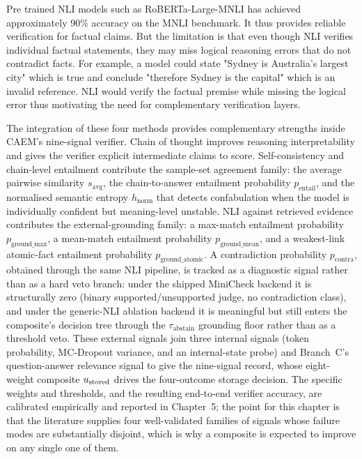 Pre trained NLI models such as RoBERTa-Large-MNLI has achieved approximately 90\% accuracy on the MNLI benchmark. It thus provides reliable verification for factual claims. But the limitation is that even though NLI verifies individual factual statements, they may miss logical reasoning errors that do not contradict facts. For example, a model could state "Sydney is Australia's largest city" which is true and conclude "therefore Sydney is the capital" which is an invalid reference. NLI would verify the factual premise while missing the logical error thus motivating the need for complementary verification layers.

The integration of these four methods provides complementary strengths inside CAEM's nine-signal verifier. Chain of thought improves reasoning interpretability and gives the verifier explicit intermediate claims to score. Self-consistency and chain-level entailment contribute the sample-set agreement family: the average pairwise similarity $s_{\text{avg}}$, the chain-to-answer entailment probability $p_{\text{entail}}$, and the normalised semantic entropy $h_{\text{norm}}$ that detects confabulation when the model is individually confident but meaning-level unstable. NLI against retrieved evidence contributes the external-grounding family: a max-match entailment probability $p_{\text{ground\_max}}$, a mean-match entailment probability $p_{\text{ground\_mean}}$, and a weakest-link atomic-fact entailment probability $p_{\text{ground\_atomic}}$. A contradiction probability $p_{\text{contra}}$, obtained through the same NLI pipeline, is tracked as a diagnostic signal rather than as a hard veto branch: under the shipped MiniCheck backend it is structurally zero (binary supported/unsupported judge, no contradiction class), and under the generic-NLI ablation backend it is meaningful but still enters the composite's decision tree through the $\tau_{\text{abstain}}$ grounding floor rather than as a threshold veto. These external signals join three internal signals (token probability, MC-Dropout variance, and an internal-state probe) and Branch~C's question-answer relevance signal to give the nine-signal record, whose eight-weight composite $u_{\text{stored}}$ drives the four-outcome storage decision. The specific weights and thresholds, and the resulting end-to-end verifier accuracy, are calibrated empirically and reported in Chapter~5; the point for this chapter is that the literature supplies four well-validated families of signals whose failure modes are substantially disjoint, which is why a composite is expected to improve on any single one of them.

